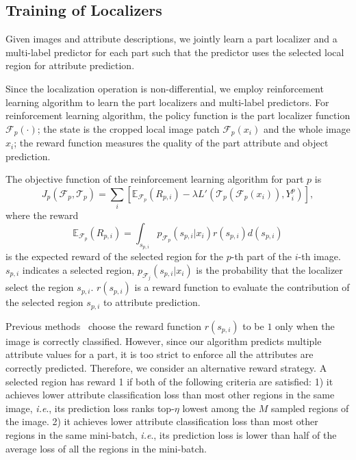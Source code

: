 \documentclass{article}
\begin{document}
\subsection{Training of Localizers}
Given images and attribute descriptions, we jointly learn a part localizer and a multi-label predictor for each part such that the predictor uses the selected local region for attribute prediction.

Since the localization operation is non-differential, we employ reinforcement learning algorithm \cite{bd20} to learn the part localizers and multi-label predictors.
For reinforcement learning algorithm, the policy function is the part localizer function $\mathcal{F}_p(\cdot)$;
the state is the cropped local image patch $\mathcal{F}_p(x_i)$ and the whole image $x_i$;
the reward function measures the quality of the part attribute and object prediction.

The objective function of the reinforcement learning algorithm for part $p$ is
\begin{equation}\label{eq:reinforcement}
J_p(\mathcal{F}_p, \mathcal{T}_p) = \sum_i  \left[  \mathbb{E}_{\mathcal{F}_p}(R_{p,i}) - \lambda  L'(\mathcal{T}_p(\mathcal{F}_p(x_i)), Y^p_i) \right ],
\end{equation}
where the reward
\begin{equation}
\mathbb{E}_{\mathcal{F}_p}(R_{p, i}) = \int_{s_{p,i}} p_{\mathcal{F}_p} (s_{p,i}|x_i)r(s_{p,i})d(s_{p,i})
\end{equation}
is the expected reward of the selected region for the $p$-th part of the $i$-th image.
$s_{p,i}$ indicates a selected region, $p_{\mathcal{F}_j} (s_{p,i}|x_i)$ is the probability that the localizer select the region $s_{p,i}$.
$r(s_{p,i})$ is a reward function to evaluate the contribution of the selected region $s_{p,i}$ to attribute prediction.

Previous methods~\cite{bd3,nips1} choose the reward function $r(s_{p,i})$ to be $1$ only when the image is correctly classified.
However, since our algorithm predicts multiple attribute values for a part, it is too strict to enforce all the attributes are correctly predicted.
Therefore, we consider an alternative reward strategy.
A selected region has reward 1 if both of the following criteria are satisfied:
1) it achieves lower attribute classification loss than most  other regions in the same image,
\emph{i.e}., its prediction loss ranks top-$\eta$ lowest among the $M$ sampled regions of the image.
2) it achieves lower attribute classification loss than most other regions in the same mini-batch,
\emph{i.e}., its prediction loss is lower than half of the average loss of all the regions in the mini-batch.
\end{document}
